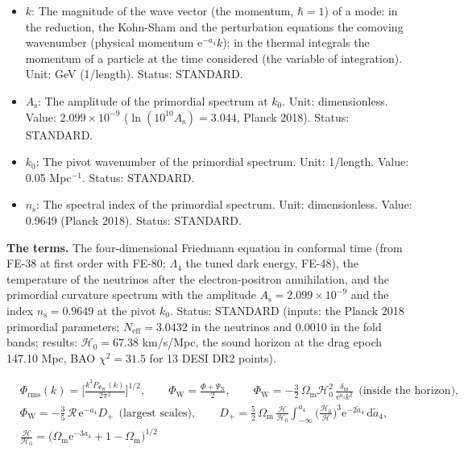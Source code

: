 \documentclass[
  10pt,
]{article}
\begin{document}
\begin{itemize}
  primordial curvature perturbation \(\mathcal{R}\). Unit:
  dimensionless. Status: STANDARD.
\item
  \(k\): The magnitude of the wave vector (the momentum, \(\hbar = 1\))
  of a mode: in the reduction, the Kohn-Sham and the perturbation
  equations the comoving wavenumber (physical momentum
  \(\mathrm{e}^{-a_4}k\)); in the thermal integrals the momentum of a
  particle at the time considered (the variable of integration). Unit:
  GeV (1/length). Status: STANDARD.
\item
  \(A_{\mathrm{s}}\): The amplitude of the primordial spectrum at
  \(k_0\). Unit: dimensionless. Value: \(2.099\times10^{-9}\)
  (\(\ln(10^{10}A_{\mathrm{s}}) = 3.044\), Planck 2018). Status:
  STANDARD.
\item
  \(k_0\): The pivot wavenumber of the primordial spectrum. Unit:
  1/length. Value: 0.05 Mpc\(^{-1}\). Status: STANDARD.
\item
  \(n_{\mathrm{s}}\): The spectral index of the primordial spectrum.
  Unit: dimensionless. Value: 0.9649 (Planck 2018). Status: STANDARD.
\end{itemize}

\textbf{The terms.} The four-dimensional Friedmann equation in conformal
time (from FE-38 at first order with FE-80; \(\Lambda_4\) the tuned dark
energy, FE-48), the temperature of the neutrinos after the
electron-positron annihilation, and the primordial curvature spectrum
with the amplitude \(A_{\mathrm{s}} = 2.099\times10^{-9}\) and the index
\(n_{\mathrm{s}} = 0.9649\) at the pivot \(k_0\). Status: STANDARD
(inputs: the Planck 2018 primordial parameters;
\(N_{\mathrm{eff}} = 3.0432\) in the neutrinos and 0.0010 in the fold
bands; results: \(\mathcal{H}_0 = 67.38\) km/s/Mpc, the sound horizon at
the drag epoch 147.10 Mpc, BAO \(\chi^2 = 31.5\) for 13 DESI DR2
points).

\[
\begin{aligned}
&\Phi_{\mathrm{rms}}(k) = \Big[\frac{k^3P_{\Phi_{\mathrm{W}}}(k)}{2\pi^2}\Big]^{1/2},\qquad
 \Phi_{\mathrm{W}} = \frac{\Phi + \Psi_{\mathrm{N}}}{2},\qquad
 \Phi_{\mathrm{W}} = -\frac32\,\Omega_{\mathrm{m}}\mathcal{H}_0^2\,\frac{\delta_{\mathrm{m}}}{
 \mathrm{e}^{a_4}k^2}\ \ \text{(inside the horizon)},\\
&\Phi_{\mathrm{W}} = -\frac35\,\mathcal{R}\,\mathrm{e}^{-a_4}D_+\ \ \text{(largest scales)},\qquad
 D_+ = \frac52\,\Omega_{\mathrm{m}}\,\frac{\mathcal{H}}{\mathcal{H}_0}\int_{-\infty}^{a_4}\Big(\frac{
 \mathcal{H}_0}{\mathcal{H}}\Big)^3
 \mathrm{e}^{-2\tilde a_4}\,\mathrm{d}\tilde a_4,\\
&\frac{\mathcal{H}}{\mathcal{H}_0} = \big(\Omega_{\mathrm{m}}\mathrm{e}^{-3a_4} + 1 -
 \Omega_{\mathrm{m}}\big)^{1/2}
\end{aligned} \tag{FE-98}
\]
\end{document}
